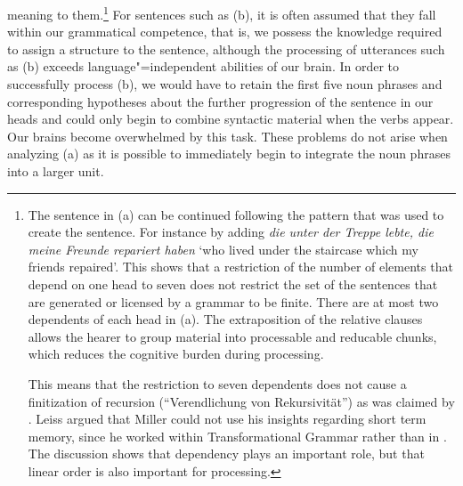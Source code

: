 meaning to them.\footnote{
  The sentence in (a) can be continued following the pattern that was used to create the
  sentence. For instance by adding \emph{die unter der
    Treppe lebte, die meine Freunde repariert haben} `who lived under the staircase which my
  friends repaired'. This shows that a restriction of the number of elements that depend on one head
to seven  \citep[]{Leiss2003a} does not restrict the set of the sentences that are
generated or licensed by a grammar to be finite. There are at most two dependents of each head in
(a). The extraposition of the relative clauses allows the hearer to group material into
processable and reducable chunks, which reduces the cognitive burden during processing.

  This means that the restriction to seven dependents does not cause a finitization of recursion
  (``Ver\-end\-lichung von Rekursivität'') as was claimed by \citet[]{Leiss2003a}.
  Leiss argued that Miller could not use his insights regarding short term memory, since he worked
  within Transformational Grammar rather than in \dg. The discussion
  shows that dependency plays an important role, but that linear order is also important for processing.
}
For sentences such as (b), it is often assumed that they fall within our grammatical competence, that is, we possess
the knowledge required to assign a structure to the sentence, although the processing of utterances such as (b) exceeds
language"=independent abilities of our brain.
In order to successfully process (b), we would have to retain the first five noun phrases and corresponding hypotheses
about the further progression of the sentence in our heads and could only begin to combine syntactic material when the verbs appear.
Our brains become overwhelmed by this task. These problems do not arise when analyzing (a) as it is possible
to immediately begin to integrate the noun phrases into a larger unit.

